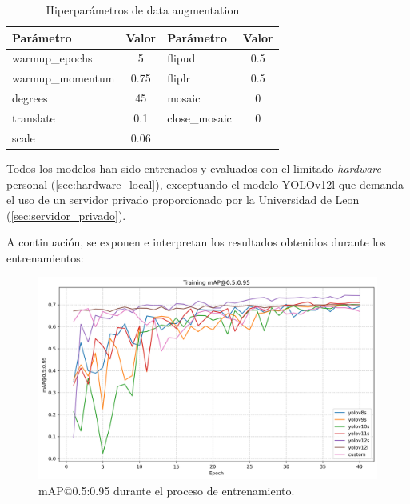 \documentclass[12pt,a4paper,onecolumn,oneside]{report}
\begin{document}
\begin{table}[H]
\caption{Hiperparámetros de data augmentation}
\label{tab:Hiperparámetros de data augmentation}
\centering
\begin{tabular}{lc|lc}
\toprule
\textbf{Parámetro} & \textbf{Valor} & \textbf{Parámetro} & \textbf{Valor} \\
\midrule
warmup\_epochs & 5 & flipud & 0.5 \\
warmup\_momentum & 0.75 & fliplr & 0.5 \\
degrees & 45 & mosaic & 0 \\
translate & 0.1 & close\_mosaic & 0 \\
scale & 0.06 & & \\
\bottomrule
\end{tabular}
\end{table}

Todos los modelos han sido entrenados y evaluados con el limitado \textit{hardware} personal (\autoref{sec:hardware_local}), exceptuando el modelo YOLOv12l que demanda el uso de un servidor privado 
proporcionado por la Universidad de Leon (\autoref{sec:servidor_privado}).

A continuación, se exponen e interpretan los resultados obtenidos durante los entrenamientos:

\begin{figure}[H]
  \centering
  \includegraphics[width=1.0\textwidth]{figuras/YOLO_plots/map50-95.png}
  \caption{mAP@0.5:0.95 durante el proceso de entrenamiento.}
  \label{fig:yolo_train_map95}
\end{figure}
\end{document}

